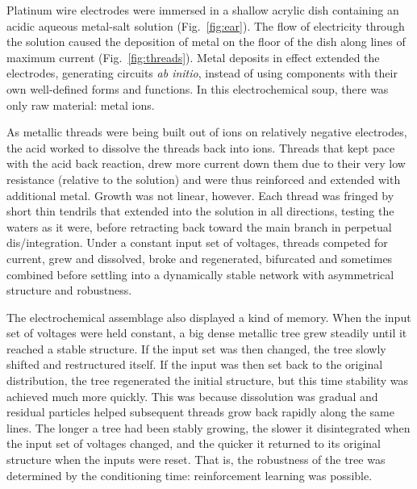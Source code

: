 

Platinum wire electrodes were immersed in a shallow acrylic dish containing an
acidic 
aqueous metal-salt
solution
\cite{pask1958physical}
(Fig.~\ref{fig:ear}).
The flow of electricity through the solution caused the deposition of metal
on the floor of the dish
along lines of maximum current
(Fig.~\ref{fig:threads}).
Metal deposits in effect extended the electrodes, generating circuits \textit{ab initio}, 
instead of using components with their own well-defined forms and functions.
In this electrochemical soup,
there was only raw material: metal ions. 

As metallic 
threads were being built out of ions on relatively negative electrodes,
the acid worked to dissolve the threads back into ions.
Threads that kept pace with the acid back reaction, drew more current down them 
due to their very low resistance (relative to the solution) and were thus
reinforced and extended with additional metal.
Growth was not linear, however.
Each thread was fringed 
by short thin tendrils that extended into the solution in all directions, testing the waters as it were, before retracting back toward the main branch in perpetual dis/integration.
Under a constant input set of voltages,
threads
competed for current, grew and dissolved, broke and regenerated, bifurcated and sometimes combined before settling into
a dynamically stable network with asymmetrical structure and robustness.

The electrochemical assemblage also displayed a kind of memory.
When the input set of voltages were held constant, a big dense metallic tree grew steadily until it reached a stable structure.
If the input set was then changed, the tree slowly
shifted and
restructured itself.
If the input was then set back to the original distribution,
the tree regenerated the initial structure, but this time stability was achieved much more quickly.
This was because dissolution was gradual and 
residual particles helped subsequent threads grow back rapidly along the same lines.
The longer a tree had been stably growing, the slower it disintegrated when the input set of voltages changed, and the quicker it returned to its original structure when the inputs were reset.
That is, the robustness of the tree was determined by the conditioning time:
reinforcement learning was possible.

